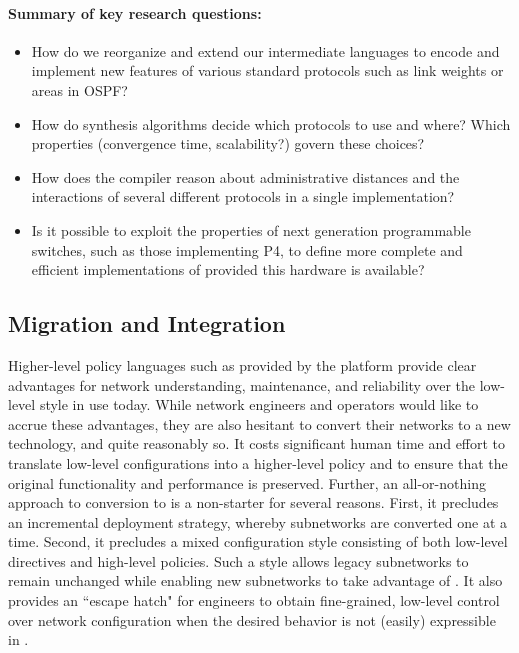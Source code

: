 \paragraph*{Summary of key research questions:}

\begin{itemize}
\item How do we reorganize and extend our intermediate languages to encode and
implement new features of various standard protocols such as link weights
or areas in OSPF?  
\item How do synthesis algorithms decide which protocols to use and where?
Which properties (convergence time, scalability?) govern these choices?
\item How does the compiler reason about administrative distances
and the interactions of several different protocols in a single
implementation?
\item Is it possible to exploit the properties of next generation
programmable switches, such as those implementing P4,
to define more complete and efficient implementations of \Propane
provided this hardware is available?
\end{itemize}

\subsection{Migration and Integration}

Higher-level policy languages such as provided by the \Propane platform provide clear advantages for network understanding, maintenance, and reliability over the low-level style in use today.  While network engineers and operators would like to accrue these advantages, they are also hesitant to convert their networks to a new technology, and quite reasonably so.  It costs significant human time and effort to translate low-level configurations into a higher-level policy and to ensure that the original functionality and performance is preserved.  Further, an all-or-nothing approach to conversion to \Propane is a non-starter for several reasons.  First, it precludes an incremental deployment strategy, whereby subnetworks are converted one at a time.  Second, it precludes a mixed configuration style consisting of both low-level directives and high-level policies.  Such a style allows legacy subnetworks to remain unchanged while enabling new subnetworks to take advantage of \Propane.  It also provides an ``escape hatch" for engineers to obtain fine-grained, low-level control over network configuration when the desired behavior is not (easily) expressible in \Propane.  

